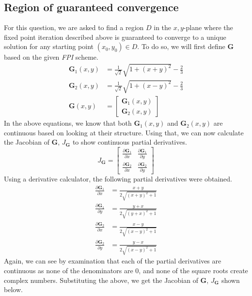 \documentclass{article}
\begin{document}
\subsection{Region of guaranteed convergence}
For this question, we are asked to find a region \(D\) in the \(x,y\)-plane where the fixed point iteration described above is guaranteed to converge to a unique solution for any starting point \((x_0,y_0) \in D\). To do so, we will first define \(\mathbf{G}\) based on the given \textit{FPI} scheme.
\[
\begin{split}
    \mathbf{G}_1(x,y) &= \frac{1}{\sqrt{2}}\sqrt{1+(x+y)^2}-\frac{2}{3} \\
    \mathbf{G}_2(x,y) &= \frac{1}{\sqrt{2}}\sqrt{1+(x-y)^2}-\frac{2}{3} \\
    \mathbf{G}(x,y) &= \begin{bmatrix}
        \mathbf{G}_1(x,y) \\
        \mathbf{G}_2(x,y)
    \end{bmatrix}
\end{split}
\]
In the above equations, we know that both \(\mathbf{G}_1(x,y)\) and \(\mathbf{G}_2(x,y)\) are continuous based on looking at their structure. Using that, we can now calculate the Jacobian of \(\mathbf{G}\), \(J_\mathbf{G}\) to show continuous partial derivatives.
\[
J_\mathbf{G} = \begin{bmatrix}
    \frac{\partial \mathbf{G}_1}{\partial x} & \frac{\partial \mathbf{G}_1}{\partial y} \\
    \frac{\partial \mathbf{G}_2}{\partial x} & \frac{\partial \mathbf{G}_2}{\partial y}
\end{bmatrix}
\]
Using a derivative calculator, the following partial derivatives were obtained.
\[
\begin{split}
    \frac{\partial \mathbf{G}_1}{\partial x} &= \frac{x + y}{2 \sqrt{\left(x + y\right)^{2} + 1}} \\
    \frac{\partial \mathbf{G}_1}{\partial y} &= \frac{y + x}{2 \sqrt{\left(y + x\right)^{2} + 1}} \\
    \frac{\partial \mathbf{G}_2}{\partial x} &= \frac{x - y}{2 \sqrt{\left(x - y\right)^{2} + 1}} \\
    \frac{\partial \mathbf{G}_2}{\partial y} &= \frac{y - x}{2 \sqrt{\left(x - y\right)^{2} + 1}}
\end{split}
\]
Again, we can see by examination that each of the partial derivatives are continuous as none of the denominators are 0, and none of the square roots create complex numbers. Substituting the above, we get the Jacobian of \(\mathbf{G}\), \(J_\mathbf{G}\) shown below.
\end{document}
